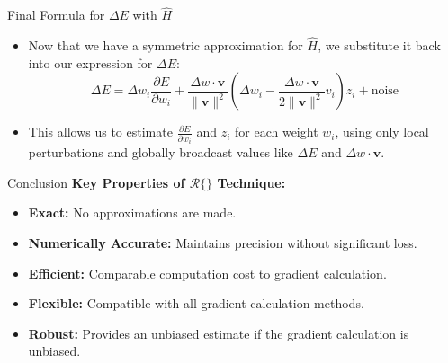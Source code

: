 \documentclass{beamer}
\begin{document}
\begin{frame}{Final Formula for \(\Delta E\) with \(\hat{H}\)}
    \begin{itemize}
        \item Now that we have a symmetric approximation for \(\hat{H}\), we substitute it back into our expression for \(\Delta E\):
        \[
        \Delta E = \Delta w_i \frac{\partial E}{\partial w_i} + \frac{\Delta w \cdot \mathbf{v}}{\| \mathbf{v} \|^2} \left( \Delta w_i - \frac{\Delta w \cdot \mathbf{v}}{2 \| \mathbf{v} \|^2} v_i \right) z_i + \text{noise}
        \]
        \item This allows us to estimate \(\frac{\partial E}{\partial w_i}\) and \(z_i\) for each weight \(w_i\), using only local perturbations and globally broadcast values like \(\Delta E\) and \(\Delta w \cdot \mathbf{v}\).
    \end{itemize}
\end{frame}

\begin{frame}{Conclusion}
\textbf{Key Properties of \( \mathcal{R} \{ \} \) Technique:}
\begin{itemize}
    \item \textbf{Exact:} No approximations are made.
    \item \textbf{Numerically Accurate:} Maintains precision without significant loss.
    \item \textbf{Efficient:} Comparable computation cost to gradient calculation.
    \item \textbf{Flexible:} Compatible with all gradient calculation methods.
    \item \textbf{Robust:} Provides an unbiased estimate if the gradient calculation is unbiased.
\end{itemize}
\end{frame}
\end{document}
